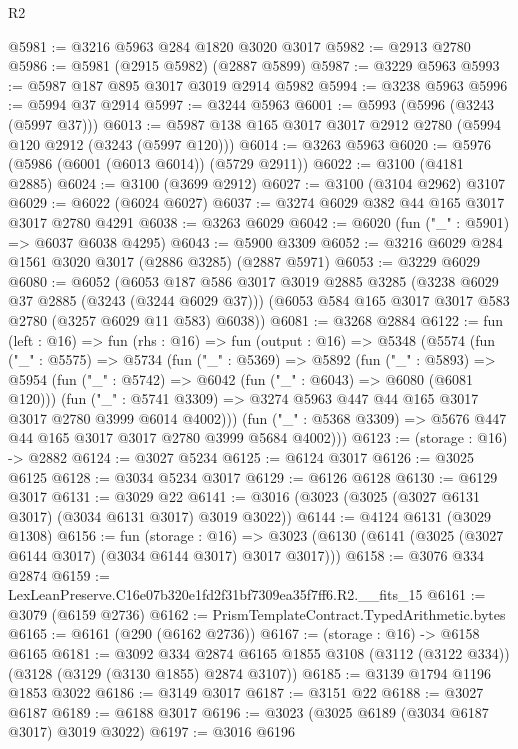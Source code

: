 \begin{lexlean}{R2}
\begin{coremodule}
@5981 := @3216 @5963 @284 @1820 @3020 @3017
@5982 := @2913 @2780
@5986 := @5981 (@2915 @5982) (@2887 @5899)
@5987 := @3229 @5963
@5993 := @5987 @187 @895 @3017 @3019 @2914 @5982
@5994 := @3238 @5963
@5996 := @5994 @37 @2914
@5997 := @3244 @5963
@6001 := @5993 (@5996 (@3243 (@5997 @37)))
@6013 := @5987 @138 @165 @3017 @3017 @2912 @2780 (@5994 @120 @2912 (@3243 (@5997 @120)))
@6014 := @3263 @5963
@6020 := @5976 (@5986 (@6001 (@6013 @6014)) (@5729 @2911))
@6022 := @3100 (@4181 @2885)
@6024 := @3100 (@3699 @2912)
@6027 := @3100 (@3104 @2962) @3107
@6029 := @6022 (@6024 @6027)
@6037 := @3274 @6029 @382 @44 @165 @3017 @3017 @2780 @4291
@6038 := @3263 @6029
@6042 := @6020 (fun ("_" : @5901) => @6037 @6038 @4295)
@6043 := @5900 @3309
@6052 := @3216 @6029 @284 @1561 @3020 @3017 (@2886 @3285) (@2887 @5971)
@6053 := @3229 @6029
@6080 := @6052
    (@6053
      @187
      @586
      @3017
      @3019
      @2885
      @3285
      (@3238 @6029 @37 @2885 (@3243 (@3244 @6029 @37)))
      (@6053 @584 @165 @3017 @3017 @583 @2780 (@3257 @6029 @11 @583) @6038))
@6081 := @3268 @2884
@6122 := fun (left : @16) =>
  fun (rhs : @16) =>
  fun (output : @16) =>
  @5348
    (@5574
      (fun ("_" : @5575) =>
      @5734
        (fun ("_" : @5369) =>
        @5892
          (fun ("_" : @5893) =>
          @5954
            (fun ("_" : @5742) => @6042 (fun ("_" : @6043) => @6080 (@6081 @120)))
            (fun ("_" : @5741 @3309) =>
            @3274 @5963 @447 @44 @165 @3017 @3017 @2780 @3999 @6014 @4002)))
        (fun ("_" : @5368 @3309) => @5676 @447 @44 @165 @3017 @3017 @2780 @3999 @5684 @4002)))
@6123 := (storage : @16) -> @2882
@6124 := @3027 @5234
@6125 := @6124 @3017
@6126 := @3025 @6125
@6128 := @3034 @5234 @3017
@6129 := @6126 @6128
@6130 := @6129 @3017
@6131 := @3029 @22
@6141 := @3016 (@3023 (@3025 (@3027 @6131 @3017) (@3034 @6131 @3017) @3019 @3022))
@6144 := @4124 @6131 (@3029 @1308)
@6156 := fun (storage : @16) =>
  @3023 (@6130 (@6141 (@3025 (@3027 @6144 @3017) (@3034 @6144 @3017) @3017 @3017)))
@6158 := @3076 @334 @2874
@6159 := LexLeanPreserve.C16e07b320e1fd2f31bf7309ea35f7ff6.R2.__fits_15
@6161 := @3079 (@6159 @2736)
@6162 := PrismTemplateContract.TypedArithmetic.bytes
@6165 := @6161 (@290 (@6162 @2736))
@6167 := (storage : @16) -> @6158 @6165
@6181 := @3092
    @334
    @2874
    @6165
    @1855
    @3108
    (@3112 (@3122 @334))
    (@3128 (@3129 (@3130 @1855) @2874 @3107))
@6185 := @3139 @1794 @1196 @1853 @3022
@6186 := @3149 @3017
@6187 := @3151 @22
@6188 := @3027 @6187
@6189 := @6188 @3017
@6196 := @3023 (@3025 @6189 (@3034 @6187 @3017) @3019 @3022)
@6197 := @3016 @6196

\end{coremodule}
\end{lexlean}
